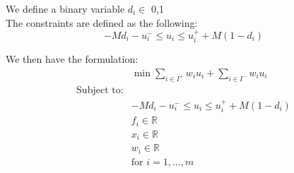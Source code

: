 \documentclass[12pt]{article}
\begin{document}
    We define a binary variable \( d_i \in\) {0,1}\\
    The constraints are defined as the following:\\ 
    \begin{equation*}
        -Md_i - u_i^- \leq u_i \leq u_i^+ + M(1-d_i)
    \end{equation*}
    
    We then have the formulation:\\ 
    \begin{align*}
        &\min \sum_{i \in I^+} w_i u_i + \sum_{i \in I^-} w_i u_i\\
        \text{Subject to:}\\
        &-Md_i - u_i^- \leq u_i \leq u_i^+ + M(1-d_i)\\
        &f_i \in \mathbb{R}\\
        &x_i \in \mathbb{R}\\
        &w_i \in \mathbb{R}\\
        &\text{for } i = 1,...,m\\
    \end{align*}\\
    [Note* = Where M is vert large number as M approaches \(\infnty\)]\\
\end{document}

